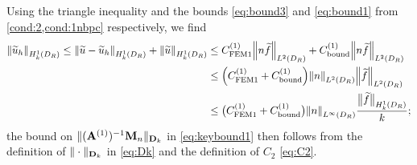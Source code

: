 
Using %
the triangle inequality and the bounds \cref{eq:bound3} and \cref{eq:bound1} from \cref{cond:2,cond:1nbpc} respectively, we find
\begin{align}
\N{\tu_h}_{\HokDR} \leq
\N{\tu-\tu_h}_{\HokDR} + \N{\tu}_{\HokDR} \label{eq:mainevent1}
& \leq C^{(1)}_{\rm FEM1}\NLtDR{n\ftilde} + C^{(1)}_{\rm bound}\NLtDR{n\ftilde} \\ 
& \leq \mleft(C^{(1)}_{\rm FEM1} + C^{(1)}_{\rm bound}\mright)\NLtDR{n}\NLtDR{\ftilde} \label{eq:mainevent1a} \\
& \leq\big(C^{(1)}_{\rm FEM1}+  C^{(1)}_{\rm bound}\big)\N{n}_{L^\infty(\DR)}\frac{\big\|\widetilde{f}\big\|_{\HokDR}}{k};\nonumber
\end{align}
the bound on $\|(\mathbf{A}^{(1)})^{-1}\mathbf{M}_n\|_{\mathbf{D}_k}$ in \cref{eq:keybound1} then follows from the definition of $\|\cdot\|_{\mathbf{D}_k}$ in \cref{eq:Dk} and the definition of $C_2$ \cref{eq:C2}.

